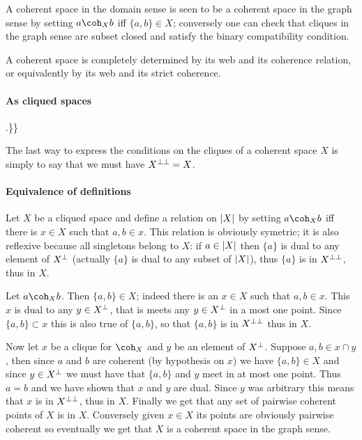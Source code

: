 A coherent space in the domain sense is seen to be a coherent space in
the graph sense by setting \(a\coh_X b\) iff \(\{a,b\}\in X\);
conversely one can check that cliques in the graph sense are subset
closed and satisfy the binary compatibility condition.

A coherent space is completely determined by its web and its coherence
relation, or equivalently by its web and its strict coherence.

\paragraph{As cliqued spaces}\label{as-cliqued-spaces}

.\}\}

The last way to express the conditions on the cliques of a coherent
space \(X\) is simply to say that we must have \(X^{\bot\bot} = X\).

\paragraph{Equivalence of definitions}\label{equivalence-of-definitions}

Let \(X\) be a cliqued space and define a relation on \(\left|X\right|\) by
setting \(a\coh_X b\) iff there is \(x\in X\) such that \(a, b\in x\).
This relation is obviously symetric; it is also reflexive because all
singletons belong to \(X\): if \(a\in \left|X\right|\) then \(\{a\}\) is dual to
any element of \(X^\bot\) (actually \(\{a\}\) is dual to any subset of
\(\left|X\right|\)), thus \(\{a\}\) is in \(X^{\bot\bot}\), thus in \(X\).

Let \(a\coh_X b\). Then \(\{a,b\}\in X\); indeed there is an \(x\in X\)
such that \(a, b\in x\). This \(x\) is dual to any \(y\in X^\bot\), that
is meets any \(y\in X^\bot\) in a most one point. Since
\(\{a,b\}\subset x\) this is also true of \(\{a,b\}\), so that
\(\{a,b\}\) is in \(X^{\bot\bot}\) thus in \(X\).

Now let \(x\) be a clique for \(\coh_X\) and \(y\) be an element of
\(X^\bot\). Suppose \(a, b\in x\cap y\), then since \(a\) and \(b\) are
coherent (by hypothesis on \(x\)) we have \(\{a,b\}\in X\) and since
\(y\in X^\bot\) we must have that \(\{a,b\}\) and \(y\) meet in at most
one point. Thus \(a = b\) and we have shown that \(x\) and \(y\) are
dual. Since \(y\) was arbitrary this means that \(x\) is in
\(X^{\bot\bot}\), thus in \(X\). Finally we get that any set of pairwise
coherent points of \(X\) is in \(X\). Conversely given \(x\in X\) its
points are obviously pairwise coherent so eventually we get that \(X\)
is a coherent space in the graph sense.

